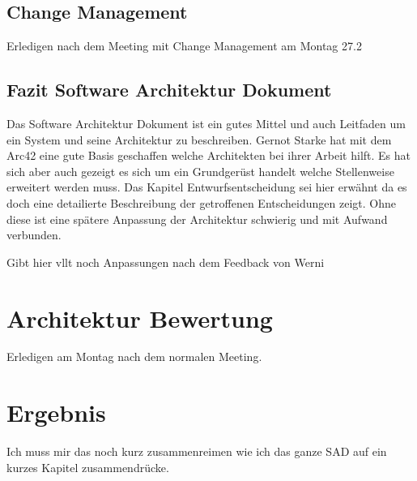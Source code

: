 \subsection{Change Management}

{\color{red} Erledigen nach dem Meeting mit Change Management am Montag 27.2}

\subsection{Fazit Software Architektur Dokument}

Das Software Architektur Dokument ist ein gutes Mittel und auch Leitfaden um ein System und seine Architektur zu beschreiben. Gernot Starke hat mit dem Arc42 eine gute Basis geschaffen welche Architekten bei ihrer Arbeit hilft. Es hat sich aber auch gezeigt es sich um ein Grundgerüst handelt welche Stellenweise erweitert werden muss. Das Kapitel Entwurfsentscheidung sei hier erwähnt da es doch eine detailierte Beschreibung der getroffenen Entscheidungen zeigt. Ohne diese ist eine spätere Anpassung der Architektur schwierig und mit Aufwand verbunden.

{\color{red} Gibt hier vllt noch Anpassungen nach dem Feedback von Werni}

\section{Architektur Bewertung}

{\color{red} Erledigen am Montag nach dem normalen Meeting.}

\section{Ergebnis}

{\color{red} Ich muss mir das noch kurz zusammenreimen wie ich das ganze SAD auf ein kurzes Kapitel zusammendrücke.}












